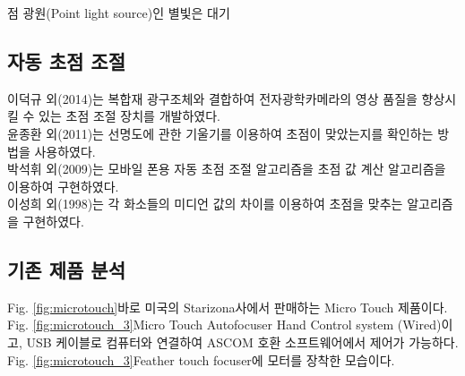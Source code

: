점 광원(Point light source)인 별빛은 대기

\subsection{자동 초점 조절}

이덕규 외(2014)는 복합재 광구조체와 결합하여 전자광학카메라의 영상 품질을 향상시킬 수 있는 초점 조절 장치를 개발하였다.\cite{leedukgu2014}\\
윤종환 외(2011)는 선명도에 관한 기울기를 이용하여 초점이 맞았는지를 확인하는 방법을 사용하였다.\cite{yunjonghwan2011lcd}\\
박석휘 외(2009)는 모바일 폰용 자동 초점 조절 알고리즘을 초점 값 계산 알고리즘을 이용하여 구현하였다.\cite{parksukhui2009Median}\\
이성희 외(1998)는 각 화소들의 미디언 값의 차이를 이용하여 초점을 맞추는 알고리즘을 구현하였다.\cite{leeseonghee1998Median}


\subsection{기존 제품 분석}

Fig. \ref{fig:microtouch}\가 바로 미국의 Starizona사에서 판매하는 Micro Touch  제품이다. Fig. \ref{fig:microtouch_3}\가 Micro Touch Autofocuser Hand Control system (Wired)이고, USB 케이블로 컴퓨터와 연결하여 ASCOM 호환 소프트웨어에서 제어가 가능하다.  Fig. \ref{fig:microtouch_3}\는 Feather touch focuser에 모터를 장착한 모습이다. 



